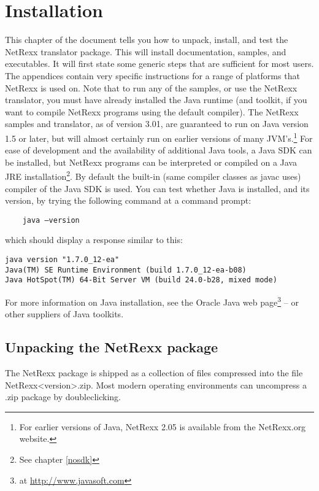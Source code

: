 \chapter{Installation}
This chapter of the document tells you how to unpack, install, and test the NetRexx translator package. This will install documentation, samples, and executables. It will first state some generic steps that are sufficient for most users. The appendices contain very specific instructions for a range of platforms that NetRexx is used on. 
Note that to run any of the samples, or use the NetRexx translator, you must have already installed the Java runtime (and toolkit, if you want to compile NetRexx programs using the default compiler). 
The NetRexx samples and translator, as of version 3.01, are
guaranteed to run on Java version 1.5 or later, but will almost
certainly run on earlier versions of many JVM's.\footnote{For earlier versions of Java,
  NetRexx 2.05 is available from the NetRexx.org website.} For ease
of development and the availability of additional Java tools, a Java
SDK can be installed, but NetRexx
programs can be interpreted or compiled on a Java JRE
installation\footnote{See chapter \ref{nosdk}}. By
default the built-in (same compiler classes as javac uses) compiler of the Java SDK is used. You can test whether Java is installed, and its version, by trying the following command at a command prompt:
\begin{verbatim} 
    java –version
\end{verbatim}
which should display a response similar to this:
\begin{verbatim} 
java version "1.7.0_12-ea"
Java(TM) SE Runtime Environment (build 1.7.0_12-ea-b08)
Java HotSpot(TM) 64-Bit Server VM (build 24.0-b28, mixed mode)
\end{verbatim}
For more information on Java installation, see the Oracle Java web page\footnote{at \url{http://www.javasoft.com}} – or other suppliers of Java toolkits.

\section{Unpacking the NetRexx package}
The NetRexx package is shipped as a collection of files compressed into the file NetRexx<version>.zip. 
Most modern operating environments can uncompress a .zip package by doubleclicking.
